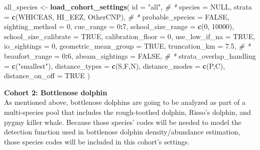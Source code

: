\documentclass[
]{book}
\newenvironment{Shaded}{\begin{snugshade}}{\end{snugshade}}
\newcommand{\AttributeTok}[1]{\textcolor[rgb]{0.13,0.29,0.53}{#1}}
\newcommand{\CommentTok}[1]{\textcolor[rgb]{0.56,0.35,0.01}{\textit{#1}}}
\newcommand{\ConstantTok}[1]{\textcolor[rgb]{0.56,0.35,0.01}{#1}}
\newcommand{\DecValTok}[1]{\textcolor[rgb]{0.00,0.00,0.81}{#1}}
\newcommand{\FloatTok}[1]{\textcolor[rgb]{0.00,0.00,0.81}{#1}}
\newcommand{\FunctionTok}[1]{\textcolor[rgb]{0.13,0.29,0.53}{\textbf{#1}}}
\newcommand{\NormalTok}[1]{#1}
\newcommand{\OtherTok}[1]{\textcolor[rgb]{0.56,0.35,0.01}{#1}}
\newcommand{\SpecialCharTok}[1]{\textcolor[rgb]{0.81,0.36,0.00}{\textbf{#1}}}
\newcommand{\StringTok}[1]{\textcolor[rgb]{0.31,0.60,0.02}{#1}}
\begin{document}
\begin{Shaded}
\begin{Highlighting}[]
\NormalTok{all\_species }\OtherTok{\textless{}{-}} \FunctionTok{load\_cohort\_settings}\NormalTok{(}
  \AttributeTok{id =} \StringTok{"all"}\NormalTok{, }\CommentTok{\# *}
  \AttributeTok{species =} \ConstantTok{NULL}\NormalTok{, }
  \AttributeTok{strata =} \FunctionTok{c}\NormalTok{(}\StringTok{\textquotesingle{}WHICEAS\textquotesingle{}}\NormalTok{, }\StringTok{\textquotesingle{}HI\_EEZ\textquotesingle{}}\NormalTok{, }\StringTok{\textquotesingle{}OtherCNP\textquotesingle{}}\NormalTok{), }\CommentTok{\# *}
  \AttributeTok{probable\_species =} \ConstantTok{FALSE}\NormalTok{,}
  \AttributeTok{sighting\_method =} \DecValTok{0}\NormalTok{,}
  \AttributeTok{cue\_range =} \DecValTok{0}\SpecialCharTok{:}\DecValTok{7}\NormalTok{,}
  \AttributeTok{school\_size\_range =} \FunctionTok{c}\NormalTok{(}\DecValTok{0}\NormalTok{, }\DecValTok{10000}\NormalTok{),}
  \AttributeTok{school\_size\_calibrate =} \ConstantTok{TRUE}\NormalTok{,}
  \AttributeTok{calibration\_floor =} \DecValTok{0}\NormalTok{,}
  \AttributeTok{use\_low\_if\_na =} \ConstantTok{TRUE}\NormalTok{,}
  \AttributeTok{io\_sightings =} \DecValTok{0}\NormalTok{,}
  \AttributeTok{geometric\_mean\_group =} \ConstantTok{TRUE}\NormalTok{,}
  \AttributeTok{truncation\_km =} \FloatTok{7.5}\NormalTok{, }\CommentTok{\# *}
  \AttributeTok{beaufort\_range =} \DecValTok{0}\SpecialCharTok{:}\DecValTok{6}\NormalTok{,}
  \AttributeTok{abeam\_sightings =} \ConstantTok{FALSE}\NormalTok{, }\CommentTok{\# *}
  \AttributeTok{strata\_overlap\_handling =} \FunctionTok{c}\NormalTok{(}\StringTok{"smallest"}\NormalTok{),}
  \AttributeTok{distance\_types =} \FunctionTok{c}\NormalTok{(}\StringTok{\textquotesingle{}S\textquotesingle{}}\NormalTok{,}\StringTok{\textquotesingle{}F\textquotesingle{}}\NormalTok{,}\StringTok{\textquotesingle{}N\textquotesingle{}}\NormalTok{),}
  \AttributeTok{distance\_modes =} \FunctionTok{c}\NormalTok{(}\StringTok{\textquotesingle{}P\textquotesingle{}}\NormalTok{,}\StringTok{\textquotesingle{}C\textquotesingle{}}\NormalTok{),}
  \AttributeTok{distance\_on\_off =} \ConstantTok{TRUE}
\NormalTok{)}
\end{Highlighting}
\end{Shaded}

\textbf{Cohort 2: Bottlenose dolphin}\\
As mentioned above, bottlenose dolphins are going to be analyzed as part of a multi-species pool that includes the rough-toothed dolphin, Risso's dolphin, and pygmy killer whale. Because those species' codes will be needed to model the detection function used in bottlenose dolphin density/abundance estimation, those species codes will be included in this cohort's settings.
\end{document}
